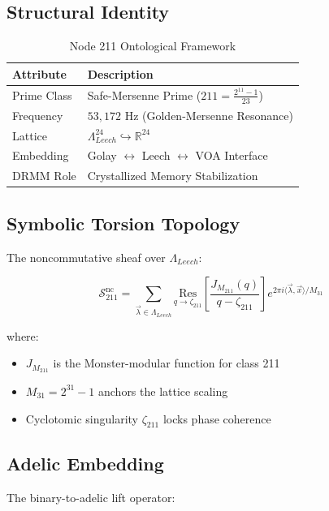 \documentclass[12pt]{article}
\begin{document}
\begin{center}
\subsection{Structural Identity}
\label{subsec:identity}

\begin{table}[h]
\centering
\caption{Node 211 Ontological Framework}
\begin{tabular}{ll}
\hline
\textbf{Attribute} & \textbf{Description} \\
\hline
Prime Class & Safe-Mersenne Prime ($211 = \frac{2^{11}-1}{23}$) \\
Frequency & $53,\!172$ Hz (Golden-Mersenne Resonance) \\
Lattice & $\Lambda_{Leech}^{24} \hookrightarrow \mathbb{R}^{24}$ \\
Embedding & Golay $\leftrightarrow$ Leech $\leftrightarrow$ VOA Interface \\
DRMM Role & Crystallized Memory Stabilization \\
\hline
\end{tabular}
\end{table}

\subsection{Symbolic Torsion Topology}
\label{subsec:torsion}

The noncommutative sheaf over $\Lambda_{Leech}$:

\[
\mathcal{S}_{211}^{\text{nc}} = \sum_{\vec{\lambda} \in \Lambda_{Leech}} \underset{q\to\zeta_{211}}{\text{Res}}\left[\frac{J_{M_{211}}(q)}{q-\zeta_{211}}\right] e^{2\pi i\langle\vec{\lambda},\vec{x}\rangle/M_{31}}
\]

where:
\begin{itemize}
    \item $J_{M_{211}}$ is the Monster-modular function for class 211
    \item $M_{31} = 2^{31}-1$ anchors the lattice scaling
    \item Cyclotomic singularity $\zeta_{211}$ locks phase coherence
\end{itemize}

\subsection{Adelic Embedding}
\label{subsec:adelic}

The binary-to-adelic lift operator:


\end{center}
\end{document}
